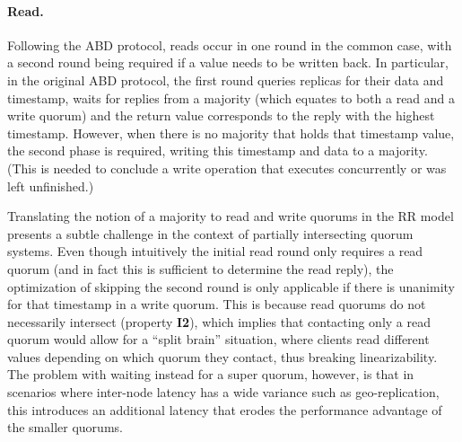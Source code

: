\paragraph{Read.} Following the ABD protocol, reads occur in one
round in the common case, with a second round being required if a
value needs to be written back. In particular, in the original ABD
protocol, the first round queries replicas for their data and
timestamp, waits for replies from a majority (which equates to both a
read and a write quorum) and the return value corresponds to the reply
with the highest timestamp. However, when there is no majority that
holds that timestamp value, the second phase is required, writing this
timestamp and data to a majority. (This is needed to conclude a write
operation that executes concurrently or was left unfinished.)

Translating the notion of a majority to read and write quorums in the
\ac{RR} model presents a subtle challenge in the context of
partially intersecting quorum systems. Even though
intuitively the initial read round only requires a read quorum (and in
fact this is sufficient to determine the read reply), the optimization
of skipping the second round is only applicable if there is unanimity
for that timestamp in a write quorum. This is because read quorums do
not necessarily intersect (property \textbf{I2}), which implies that
contacting only a read quorum would allow for a ``split brain''
situation, where clients read different values depending on which
quorum they contact, thus breaking linearizability. The problem with
waiting instead for a super quorum, however, is that in scenarios
where inter-node latency has a wide variance such as geo-replication,
this introduces an additional latency that erodes the performance
advantage of the smaller quorums.





